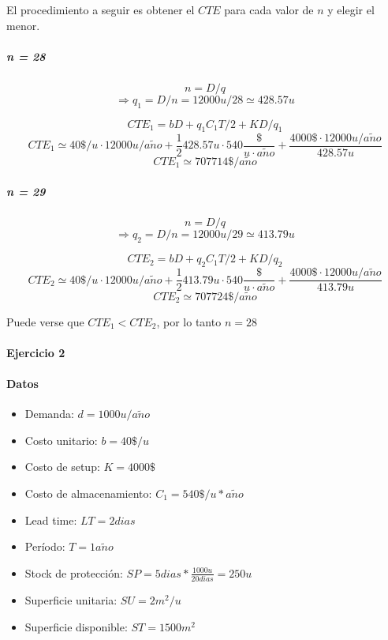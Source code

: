 \documentclass{article}
\def \anio {a\tilde{n}o}
\begin{document}
	El procedimiento a seguir es obtener el $CTE$ para cada valor de $n$ y elegir el menor.

	\subparagraph{n = 28}
	$$ n = D / q $$
	$$\Rightarrow q_1 = D / n = 12000u/28 \simeq 428.57u $$

        $$ CTE_1 = b D + q_1 C_1 T / 2 + K D / q_1 $$
        $$ CTE_1 \simeq 40\$/u \cdot 12000u/\anio + \frac{1}{2} 428.57u \cdot 540\frac{\$}{u\cdot\anio} + \frac{4000\$ \cdot 12000u/\anio}{428.57u} $$
        $$ CTE_1 \simeq 707714 \$/\anio $$

	\subparagraph{n = 29}
	$$ n = D / q $$
	$$\Rightarrow q_2 = D / n = 12000u/29 \simeq 413.79u $$

        $$ CTE_2 = b D + q_2 C_1 T / 2 + K D / q_2 $$
        $$ CTE_2 \simeq 40\$/u \cdot 12000u/\anio + \frac{1}{2} 413.79u \cdot 540\frac{\$}{u\cdot\anio} + \frac{4000\$ \cdot 12000u/\anio}{413.79u} $$
        $$ CTE_2 \simeq 707724 \$/\anio $$

        Puede verse que $CTE_1 < CTE_2$, por lo tanto $ \boxed{ n = 28 } $

\paragraph{Ejercicio 2}
  \paragraph{Datos}
    \begin{itemize}
      \item Demanda: $d = 1000u/\anio$
      \item Costo unitario: $b = 40\$/u$
      \item Costo de setup: $K = 4000\$$ 
      \item Costo de almacenamiento: $C_1 = 540\$/u * \anio$
      \item Lead time: $LT = 2dias$
      \item Período: $T = 1\anio$
      \item Stock de protección: $ SP = 5dias * \frac{1000u}{20dias} = 250u$
      \item Superficie unitaria: $ SU = 2m^2/u$
      \item Superficie disponible: $ ST = 1500m^2$
    \end{itemize}
\end{document}
